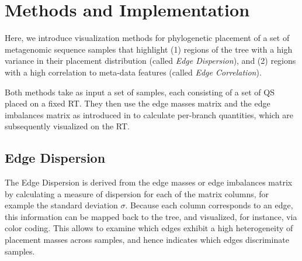 
\section{Methods and Implementation}
\label{ch:Visualization:sec:Methods}

Here, we introduce visualization methods for phylogenetic placement of a set of metagenomic sequence samples
that highlight (1) regions of the tree with a high variance in their placement distribution (called \emph{Edge Dispersion}),
and (2) regions with a high correlation to meta-data features (called \emph{Edge Correlation}).

Both methods take as input a set of samples, each consisting of a set of \acf{QS} placed on a fixed \acf{RT}.
They then use the edge masses matrix and the edge imbalances matrix
as introduced in 
to calculate per-branch quantities, which are subsequently visualized on the \ac{RT}.


\subsection{Edge Dispersion}
\label{ch:Visualization:sec:Methods:sub:EdgeDispersion}

The Edge Dispersion is derived from the edge masses or edge imbalances matrix
by calculating a measure of dispersion for each of the matrix columns, for example the standard deviation $\sigma$.
Because each column corresponds to an edge, this information can be mapped back to the tree,
and visualized, for instance, via color coding.
This allows to examine which edges exhibit a high heterogeneity of placement masses across samples,
and hence indicates which edges discriminate samples.

